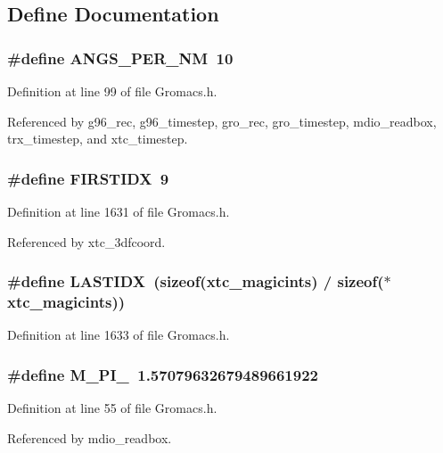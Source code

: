 \subsection{Define Documentation}
\subsubsection{\setlength{\rightskip}{0pt plus 5cm}\#define ANGS\_\-PER\_\-NM\ 10}\label{Gromacs_8h_a24}




Definition at line 99 of file Gromacs.h.

Referenced by g96\_\-rec, g96\_\-timestep, gro\_\-rec, gro\_\-timestep, mdio\_\-readbox, trx\_\-timestep, and xtc\_\-timestep.
\subsubsection{\setlength{\rightskip}{0pt plus 5cm}\#define FIRSTIDX\ 9}\label{Gromacs_8h_a30}




Definition at line 1631 of file Gromacs.h.

Referenced by xtc\_\-3dfcoord.
\subsubsection{\setlength{\rightskip}{0pt plus 5cm}\#define LASTIDX\ (sizeof({\bf xtc\_\-magicints}) / sizeof($\ast${\bf xtc\_\-magicints}))}\label{Gromacs_8h_a31}




Definition at line 1633 of file Gromacs.h.
\subsubsection{\setlength{\rightskip}{0pt plus 5cm}\#define M\_\-PI\_\ 1.57079632679489661922}\label{Gromacs_8h_a0}




Definition at line 55 of file Gromacs.h.

Referenced by mdio\_\-readbox.
